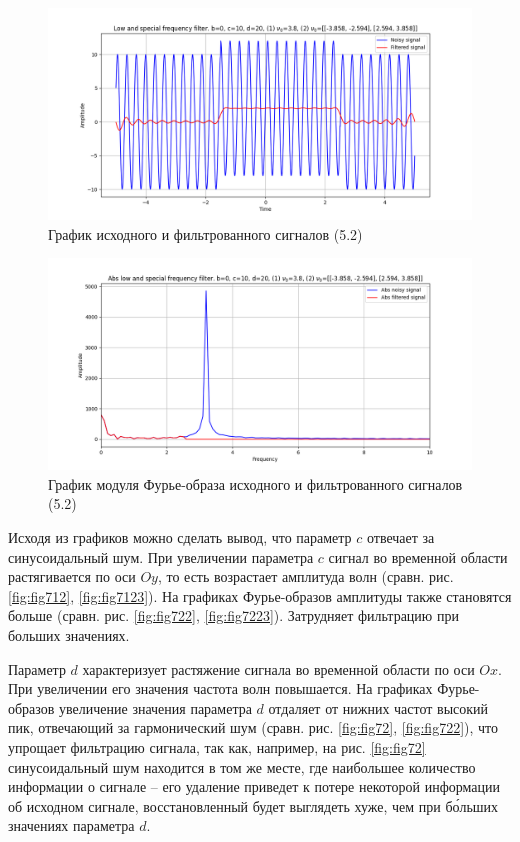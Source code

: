\documentclass[a4paper, 12pt]{article}
\begin{document}
    \begin{figure}[H]
        \centering
        \includegraphics[scale=0.48]{5_nospec_nohigh.png}
        \captionsetup{skip=0pt}
        \caption{График исходного и фильтрованного сигналов (5.2)}
        \label{fig:fig772345}
    \end{figure}
    \begin{figure}[H]
        \centering
        \includegraphics[scale=0.48]{5_abs_nospec_nohigh.png}
        \captionsetup{skip=0pt}
        \caption{График модуля Фурье-образа исходного и фильтрованного сигналов (5.2)}
        \label{fig:fig782345}
    \end{figure}


    Исходя из графиков можно сделать вывод, что параметр $c$ отвечает за синусоидальный шум. При увеличении параметра $c$
    сигнал во временной области растягивается по оси $Oy$, то есть возрастает амплитуда волн (сравн. рис. \ref{fig:fig712}, \ref{fig:fig7123}).
    На графиках Фурье-образов амплитуды также становятся больше (сравн. рис. \ref{fig:fig722}, \ref{fig:fig7223}). Затрудняет фильтрацию
    при больших значениях.


    Параметр $d$ характеризует растяжение сигнала во временной области по оси $Ox$. При увеличении его значения частота волн повышается.
    На графиках Фурье-образов увеличение значения параметра $d$ отдаляет от нижних частот высокий пик, отвечающий за
    гармонический шум (сравн. рис. \ref{fig:fig72}, \ref{fig:fig722}), что упрощает фильтрацию сигнала, так как, например, на рис. \ref{fig:fig72}
    синусоидальный шум находится в том же месте, где наибольшее количество информации о сигнале -- его удаление приведет к потере некоторой информации об исходном сигнале,
    восстановленный будет выглядеть хуже, чем при б\'{о}льших значениях параметра $d$.
\end{document}

